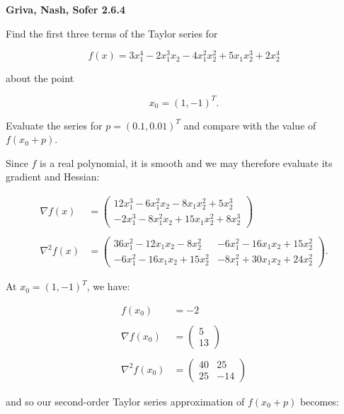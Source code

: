 \textbf{Griva, Nash, Sofer 2.6.4}

Find the first three terms of the Taylor series for 

$$
  f(x) = 3 x_1^4 - 2 x_1^3 x_2 - 4 x_1^2 x_2^2 + 5 x_1 x_2^3 + 2 x_2^4
$$

about the point 

$$
  x_0 = (1, -1)^T.
$$

Evaluate the series for $p = (0.1, 0.01)^T$ and compare with the value of
$f(x_0 + p)$.


\begin{solution}
  Since $f$ is a real polynomial, it is smooth and we may therefore evaluate its 
  gradient and Hessian:

  \begin{align*}
    \nabla f(x) &= \begin{pmatrix}
      12 x_1^3 - 6 x_1^2 x_2 - 8 x_1 x_2^2 + 5 x_2^3 \\
      -2 x_1^3 - 8 x_1^2 x_2 + 15 x_1 x_2^2 + 8 x_2^3
    \end{pmatrix} \\\\
    \nabla^2 f(x) &= \begin{pmatrix}
      36 x_1^2 - 12 x_1 x_2 - 8 x_2^2  & -6 x_1^2 - 16 x_1 x_2 + 15 x_2^2 \\
      -6 x_1^2 - 16 x_1 x_2 + 15 x_2^2 & -8 x_1^2 + 30 x_1 x_2 + 24 x_2^2
    \end{pmatrix}.
  \end{align*}

  At $x_0 = (1, -1)^T$, we have:


  \begin{align*}
    f(x_0) &= -2 \\\\
    \nabla f(x_0) &= \begin{pmatrix}
      5 \\
      13
    \end{pmatrix} \\\\
    \nabla^2 f(x_0) &= \begin{pmatrix}
      40 &  25 \\
      25 & -14
    \end{pmatrix}
  \end{align*}

  and so our second-order Taylor series approximation of $f(x_0 + p)$ becomes:


\end{solution}
